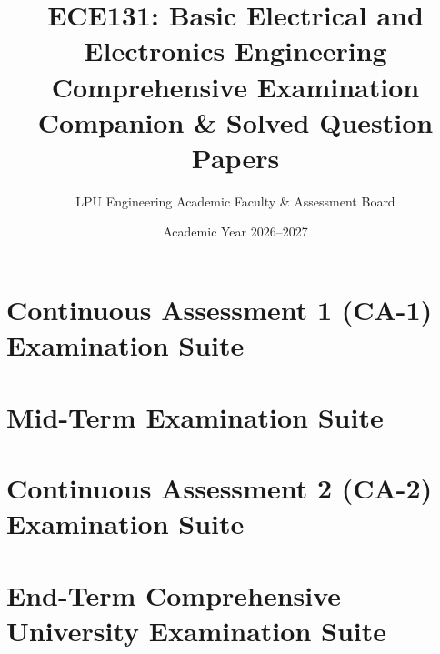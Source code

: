\documentclass[a4paper,11pt,oneside,openany]{book}
\title{\textbf{ECE131: Basic Electrical and Electronics Engineering}\\Comprehensive Examination Companion \& Solved Question Papers}
\author{LPU Engineering Academic Faculty \& Assessment Board}
\date{Academic Year 2026--2027}
\begin{document}
\frontmatter
\maketitle


\tableofcontents
\newpage

\mainmatter

\chapter{Continuous Assessment 1 (CA-1) Examination Suite}



\chapter{Mid-Term Examination Suite}


\chapter{Continuous Assessment 2 (CA-2) Examination Suite}


\chapter{End-Term Comprehensive University Examination Suite}

\end{document}
